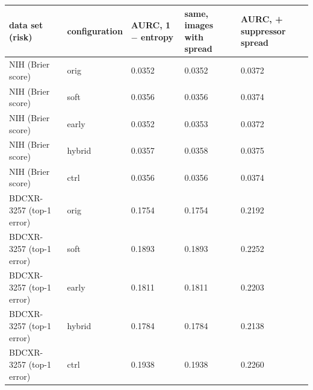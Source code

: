 \begin{tabular}{lllll}
\toprule
data set (risk) & configuration & AURC, 1 $-$ entropy & same, images with spread & AURC, + suppressor spread \\
\midrule
NIH (Brier score) & orig & 0.0352 & 0.0352 & 0.0372 \\
NIH (Brier score) & soft & 0.0356 & 0.0356 & 0.0374 \\
NIH (Brier score) & early & 0.0352 & 0.0353 & 0.0372 \\
NIH (Brier score) & hybrid & 0.0357 & 0.0358 & 0.0375 \\
NIH (Brier score) & ctrl & 0.0356 & 0.0356 & 0.0374 \\
BDCXR-3257 (top-1 error) & orig & 0.1754 & 0.1754 & 0.2192 \\
BDCXR-3257 (top-1 error) & soft & 0.1893 & 0.1893 & 0.2252 \\
BDCXR-3257 (top-1 error) & early & 0.1811 & 0.1811 & 0.2203 \\
BDCXR-3257 (top-1 error) & hybrid & 0.1784 & 0.1784 & 0.2138 \\
BDCXR-3257 (top-1 error) & ctrl & 0.1938 & 0.1938 & 0.2260 \\
\bottomrule
\end{tabular}
